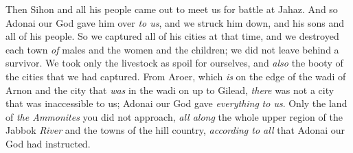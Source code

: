 \begin{biblechapter}
\verse Then Sihon and all his people came out to meet us for battle at Jahaz.
\verse And so Adonai our God gave him over \textit{to us}, and we struck him down, and his sons and all of his people.
\verse So we captured all of his cities at that time, and we destroyed each town \textit{of} males and the women and the children; we did not leave behind a survivor.
\verse We took only the livestock as spoil for ourselves, and \textit{also} the booty of the cities that we had captured.
\verse From Aroer, which \textit{is} on the edge of the wadi of Arnon and the city that \textit{was} in the wadi on up to Gilead, \textit{there} was not a city that was inaccessible to us; Adonai our God gave \textit{everything} \textit{to us}.
\verse Only the land of \textit{the Ammonites} you did not approach, \textit{all along} the whole upper region of the Jabbok \textit{River} and the towns of the hill country, \textit{according to all} that Adonai our God had instructed.
\end{biblechapter}

